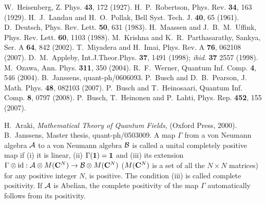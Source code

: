 \documentclass[showpacs,preprintnumbers,amsmath,amssymb]{revtex4}
\begin{document}
\begin{thebibliography}{9}
W.~Heisenberg, Z. Phys. {\bf 43}, 172 (1927).
H.~P.~Robertson, Phys. Rev. {\bf 34}, 163 (1929).
H.~J.~Landau and H.~O.~Pollak, 
Bell Syst. Tech. J. {\bf 40}, 65 (1961).
D.~Deutsch, 
Phys. Rev. Lett. {\bf 50}, 631 (1983).
H.~Maassen and J.~B.~M.~Uffink, 
Phys. Rev. Lett. {\bf 60}, 1103 (1988).
M.~Krishna and K.~R.~Parthasarathy, 
Sankya, Ser. A {\bf 64}, 842 (2002).
T.~Miyadera and H.~Imai, 
Phys. Rev. A {\bf 76}, 062108 (2007).
D.~M.~Appleby,
Int.J.Theor.Phys. {\bf 37}, 1491 (1998); 
{\em ibid}. {\bf 37} 2557 (1998).
M.~Ozawa, 
Ann. Phys. {\bf 311}, 350 (2004). 
R.~F.~Werner, Quantum Inf. Comp. {\bf 4}, 546 (2004).
B.~Janssens, quant-ph/0606093. 
P.~Busch and D.~B.~Pearson, J. Math. Phys. {\bf 48},
082103 (2007).
P.~Busch and T.~Heinosaari, 
Quantum Inf. Comp. {\bf 8}, 0797 (2008).
P.~Busch, T.~Heinonen and P.~Lahti, 
Phys. Rep. {\bf 452}, 155 (2007). 

H.~Araki, {\it Mathematical Theory of Quantum 
Fields}, (Oxford Press, 2000).
B.~Janssens, Master thesis, quant-ph/0503009.
A map $\Gamma$ from a von Neumann algebra 
${\cal A}$ to a von Neumann algebra ${\cal B}$ is called 
a unital completely 
positive map if (i) it is linear, (ii)
$\Gamma({\bf 1})={\bf 1}$ and
(iii) its extension 
$\Gamma \otimes \mbox{id}: 
{\cal A} \otimes M({\bf C}^N) 
\to {\cal B} \otimes M({\bf C}^N)$ 
($M({\bf C}^N)$ is a set of all the $N\times N$ matrices)
for any positive integer $N$, is positive. 
The condition (iii) is called complete positivity. 
If ${\cal A}$ 
is Abelian, the 
complete positivity of the map $\Gamma$ automatically 
follows from its positivity. 
\end{thebibliography}
\end{document}
